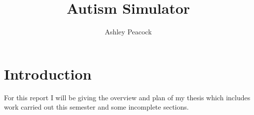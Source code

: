 \documentclass[11pt]{report}
\begin{document}
\title{Autism Simulator}
\author{Ashley Peacock}
\maketitle
\tableofcontents
\chapter{Introduction}
For this report I will be giving the overview and plan of my thesis which includes work carried out this semester and some incomplete sections.
\end{document}
